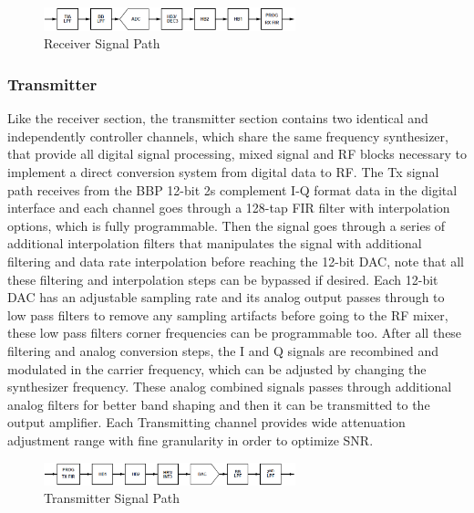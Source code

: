 \begin{figure}[htbp]
    \centering
    \includegraphics[width=0.65\textwidth]{./figures/rx_chain}
    \caption{ Receiver Signal Path
    \label{fig:rxchain}}
\end{figure}


\subsubsection{Transmitter}

Like the receiver section, the transmitter section contains two identical and
independently controller channels, which share the same frequency synthesizer,
that provide all digital signal processing, mixed signal and RF blocks necessary
to implement a direct conversion system from digital data to RF. The Tx signal
path receives from the BBP 12-bit 2s complement I-Q format data in the digital
interface and each channel goes through a 128-tap FIR filter with interpolation
options, which is fully programmable. Then the signal goes through a series of
additional interpolation filters that manipulates the signal with additional
filtering and data rate interpolation before reaching the 12-bit DAC, note that
all these filtering and interpolation steps can be bypassed if desired. Each
12-bit DAC has an adjustable sampling rate and its analog output passes through
to low pass filters to remove any sampling artifacts before going to the RF
mixer, these low pass filters corner frequencies can be programmable too. After
all these filtering and analog conversion steps, the I and Q signals are
recombined and modulated in the carrier frequency, which can be adjusted by
changing the synthesizer frequency. These analog combined signals passes through
additional analog filters for better band shaping and then it can be transmitted
to the output amplifier. Each Transmitting channel provides wide attenuation
adjustment range with fine granularity in order to optimize SNR.\\

\begin{figure}[htbp]
    \centering
    \includegraphics[width=0.65\textwidth]{./figures/tx_chain}
    \caption{ Transmitter Signal Path
    \label{fig:txchain}}
\end{figure}


